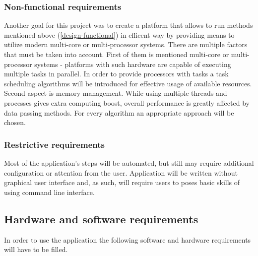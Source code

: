 \subsubsection{Non-functional requirements}
Another goal for this project was to create a platform that allows to run methods mentioned above (\ref{design-functional}) in efficent way by providing means to utilize modern multi-core or multi-processor systems. There are multiple factors that must be taken into account. First of them is mentioned multi-core or multi-processor systems - platforms with such hardware are capable of executing multiple tasks in parallel. In order to provide processors with tasks a task scheduling algorithms will be introduced for effective usage of available resources. Second aspect is memory management. While using multiple threads and processes gives extra computing boost, overall performance is greatly affected by data passing methods. For every algorithm an appropriate approach will be chosen.

\subsubsection{Restrictive requirements}
Most of the application's steps will be automated, but still may require additional configuration or attention from the user. Application will be written without graphical user interface and, as such, will require users to poses basic skills of using command line interface. 

\subsection{Hardware and software requirements}
In order to use the application the following software and hardware requirements will have to be filled.


